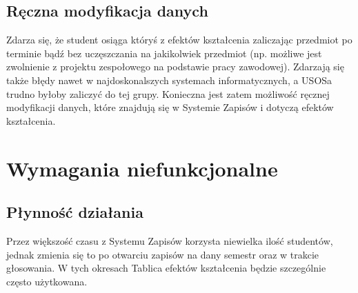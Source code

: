 \documentclass{article}
\begin{document}
\subsection{Ręczna modyfikacja danych}
Zdarza się, że student osiąga któryś z efektów kształcenia zaliczając przedmiot po terminie bądź bez uczęszczania na jakikolwiek przedmiot (np. możliwe jest zwolnienie z projektu zespołowego na podstawie pracy zawodowej). Zdarzają się także błędy nawet w najdoskonalszych systemach informatycznych, a USOSa trudno byłoby zaliczyć do tej grupy. Konieczna jest zatem możliwość ręcznej modyfikacji danych, które znajdują się w Systemie Zapisów i dotyczą efektów kształcenia.



\section{Wymagania niefunkcjonalne}

\subsection{Płynność działania} %
Przez większość czasu z Systemu Zapisów korzysta niewielka ilość studentów, jednak zmienia się to po otwarciu zapisów na dany semestr oraz w trakcie głosowania. W tych okresach Tablica efektów kształcenia będzie szczególnie często użytkowana.
\end{document}
